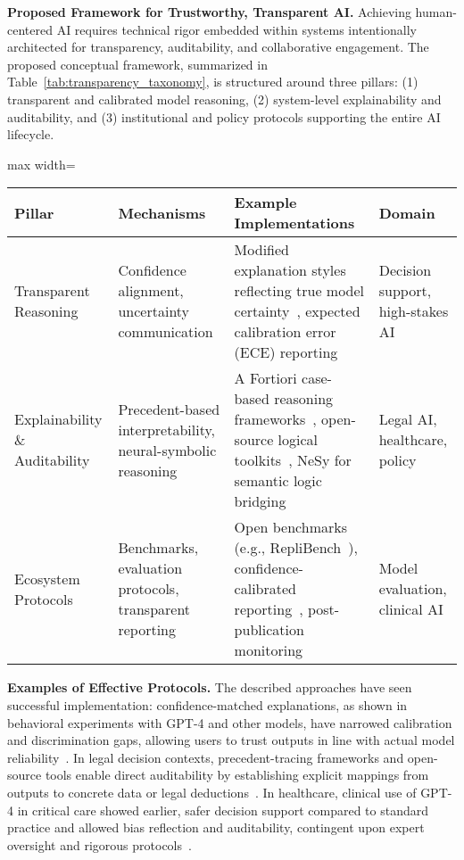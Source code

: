 \documentclass[sigconf]{acmart}
\begin{document}
\textbf{Proposed Framework for Trustworthy, Transparent AI.} Achieving human-centered AI requires technical rigor embedded within systems intentionally architected for transparency, auditability, and collaborative engagement. The proposed conceptual framework, summarized in Table~\ref{tab:transparency_taxonomy}, is structured around three pillars: (1) transparent and calibrated model reasoning, (2) system-level explainability and auditability, and (3) institutional and policy protocols supporting the entire AI lifecycle.

\begin{table*}[htbp]
\centering
\caption{Taxonomy of Human-Centric Transparency and Accountability in LLM Systems}
\label{tab:transparency_taxonomy}
\begin{adjustbox}{max width=\textwidth}
\begin{tabular}{@{}llll@{}}
\toprule
Pillar & Mechanisms & Example Implementations & Domain \\ 
\midrule
Transparent Reasoning & Confidence alignment, uncertainty communication & Modified explanation styles reflecting true model certainty~\cite{ref35}, expected calibration error (ECE) reporting~\cite{ref35} & Decision support, high-stakes AI \\
Explainability \& Auditability & Precedent-based interpretability, neural-symbolic reasoning & A Fortiori case-based reasoning frameworks~\cite{ref46}, open-source logical toolkits~\cite{ref46}, NeSy for semantic logic bridging~\cite{ref44,ref52} & Legal AI, healthcare, policy \\
Ecosystem Protocols & Benchmarks, evaluation protocols, transparent reporting & Open benchmarks (e.g., RepliBench~\cite{ref23}), confidence-calibrated reporting~\cite{ref42}, post-publication monitoring~\cite{ref40,ref53} & Model evaluation, clinical AI \\
\bottomrule
\end{tabular}
\end{adjustbox}
\end{table*}

\textbf{Examples of Effective Protocols.} The described approaches have seen successful implementation: confidence-matched explanations, as shown in behavioral experiments with GPT-4 and other models, have narrowed calibration and discrimination gaps, allowing users to trust outputs in line with actual model reliability~\cite{ref35}. In legal decision contexts, precedent-tracing frameworks and open-source tools enable direct auditability by establishing explicit mappings from outputs to concrete data or legal deductions~\cite{ref46}. In healthcare, clinical use of GPT-4 in critical care showed earlier, safer decision support compared to standard practice and allowed bias reflection and auditability, contingent upon expert oversight and rigorous protocols~\cite{ref53}.
\end{document}

